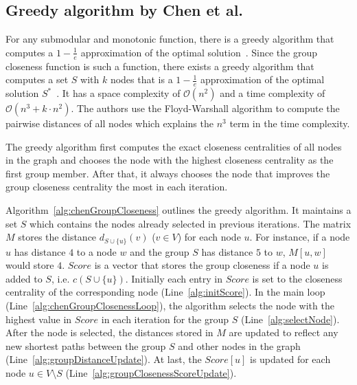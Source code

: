 \subsection{Greedy algorithm by Chen et al.}
For any submodular and monotonic function, there is a greedy algorithm that computes a $1 - \frac{1}{e}$ approximation of the optimal solution~\cite{nemhauser1978analysis}. Since the group closeness function is such a function, there exists a greedy algorithm that computes a set $S$ with $k$ nodes that is a $1 - \frac{1}{e}$ approximation of the optimal solution $S^*$~\cite{Chen2016}. It has a space complexity of $\mathcal{O}(n^2)$ and a time complexity of $\mathcal{O}(n^3 + k \cdot n^2)$. The authors use the Floyd-Warshall algorithm to compute the pairwise distances of all nodes which explains the $n^3$ term in the time complexity.

The greedy algorithm first computes the exact closeness centralities of all nodes in the graph and chooses the node with the highest closeness centrality as the first group member. After that, it always chooses the node that improves the group closeness centrality the most in each iteration.

Algorithm~\ref{alg:chenGroupCloseness} outlines the greedy algorithm. It maintains a set $S$ which contains the nodes already selected in previous iterations. The matrix $M$ stores the distance $d_{S \cup \{u\}}(v)$ ($v \in V$) for each node $u$. For instance, if a node $u$ has distance $4$ to a node $w$ and the group $S$ has distance $5$ to $w$, $M[u, w]$ would store $4$. $Score$ is a vector that stores the group closeness if a node $u$ is added to $S$, i.e. $c(S \cup \{u\})$. Initially each entry in $Score$ is set to the closeness centrality of the corresponding node (Line~\ref{alg:initScore}). In the main loop (Line~\ref{alg:chenGroupClosenessLoop}), the algorithm selects the node with the highest value in $Score$ in each iteration for the group $S$ (Line~\ref{alg:selectNode}). After the node is selected, the distances stored in $M$ are updated to reflect any new shortest paths between the group $S$ and other nodes in the graph (Line~\ref{alg:groupDistanceUpdate}). At last, the $Score[u]$ is updated for each node $u \in V \setminus S$ (Line~\ref{alg:groupClosenessScoreUpdate}).

